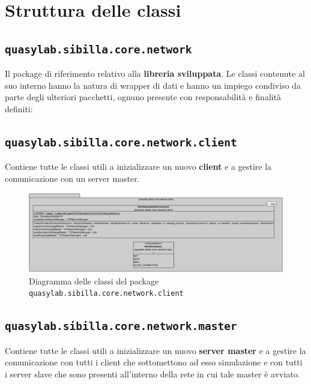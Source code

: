 

\section{Struttura delle classi}

\subsection{\texttt{quasylab.sibilla.core.network}}
Il package di riferimento relativo alla \textbf{libreria sviluppata}. Le classi contenute al suo interno hanno la natura di wrapper di dati e hanno un impiego condiviso da parte degli ulteriori pacchetti, ognuno presente con responsabilità e finalità definiti:

\subsection{\texttt{quasylab.sibilla.core.network.client}} Contiene tutte le classi utili a inizializzare un nuovo \textbf{client} e a gestire la comunicazione con un server master.

\begin{figure}[H]
    \includegraphics[width=\linewidth]{images/quasylab.sibilla.core.network.client.png}
    \captionsetup{justification=centering}
    \caption{Diagramma delle classi del package \texttt{quasylab.sibilla.core.network.client}}
  \end{figure}

\subsection{\texttt{quasylab.sibilla.core.network.master}} Contiene tutte le classi utili a inizializzare un nuovo \textbf{server master} e a gestire la comunicazione con tutti i client che sottomettono ad esso simulazione e con tutti i server slave che sono presenti all’interno della rete in cui tale master è avviato.

